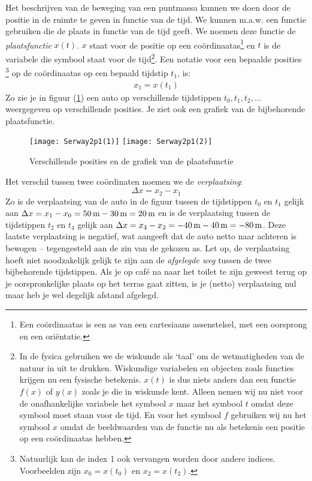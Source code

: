 \documentclass{ximera}
\begin{document}
	Het beschrijven van de beweging van een puntmassa kunnen we doen door de positie in de ruimte te geven in functie van de tijd. We kunnen m.a.w. een functie gebruiken die de plaats in functie van de tijd geeft. We noemen deze functie de \emph{plaatsfunctie} $x(t)$. $x$ staat voor de positie op een co\"ordinaatas\footnote{Een co\"ordinaatas is een as van een cartesiaans assenstelsel, met een oorsprong en een ori\"entatie.} en $t$ is de variabele die symbool staat voor de tijd\footnote{In de fysica gebruiken we de wiskunde als `taal' om de wetmatigheden van de natuur in uit te drukken. Wiskundige variabelen en objecten zoals functies krijgen nu een fysische betekenis. $x(t)$ is dus niets anders dan een functie $f(x)$ of $y(x)$ zoals je die in wiskunde kent. Alleen nemen wij nu niet voor de onafhankelijke variabele het symbool $x$ maar het symbool $t$ omdat deze symbool moet staan voor de tijd. En voor het symbool $f$ gebruiken wij nu het symbool $x$ omdat de beeldwaarden van de functie nu als betekenis een positie op een co\"ordinaatas hebben.}. Een notatie voor een bepaalde posities \footnote{Natuurlijk kan de index 1 ook vervangen worden door andere indices. Voorbeelden zijn $x_0=x(t_0)$ en $x_2=x(t_2)$.} op de co\"ordinaatas op een bepaald tijdstip $t_1$, is:
	\begin{eqnarray*}
	x_1=x(t_1)
	\end{eqnarray*}
	Zo zie je in figuur (\ref{grafplaatsfunctie}) een auto op verschillende tijdstippen $t_0,t_1, t_2,\ldots$ weer\-ge\-ge\-ven op verschillende posities. Je ziet ook een grafiek van de bijbehorende plaatsfunctie.
	
	\begin{figure}[h]
	\hfill
	\texttt{[image: Serway2p1(1)]}
	\hfill
	\texttt{[image: Serway2p1(2)]}
	\hfill
	\caption{Verschillende posities en de grafiek van de plaatsfunctie}
	\label{grafplaatsfunctie}
	\end{figure}
	
	Het verschil tussen twee co\"ordinaten noemen we de \emph{verplaatsing}:
	\[
	\Delta x = x_2-x_1
	\]
	Zo is de verplaatsing van de auto in de figuur tussen de tijdstippen $t_0$ en $t_1$ gelijk aan $\Delta x = x_1-x_0=50\rm\,m-30\rm\,m=20\rm\,m$ en is de verplaatsing tussen de tijdstippen $t_2$ en $t_4$ gelijk aan $\Delta x=x_4-x_2=-40\rm\,m-40\rm\,m=-80\rm\,m$. Deze laatste verplaatsing is negatief, wat aangeeft dat de auto netto naar achteren is bewogen -- tegengesteld aan de zin van de gekozen as.
	Let op, de verplaatsing hoeft niet noodzakelijk gelijk te zijn aan de \emph{afgelegde weg} tussen de twee bijbehorende tijdstippen. Als je op caf\'e na naar het toilet te zijn geweest terug op je oorspronkelijke plaats op het terras gaat zitten, is je (netto) verplaatsing nul maar heb je wel degelijk afstand afgelegd.
	
\end{document}
